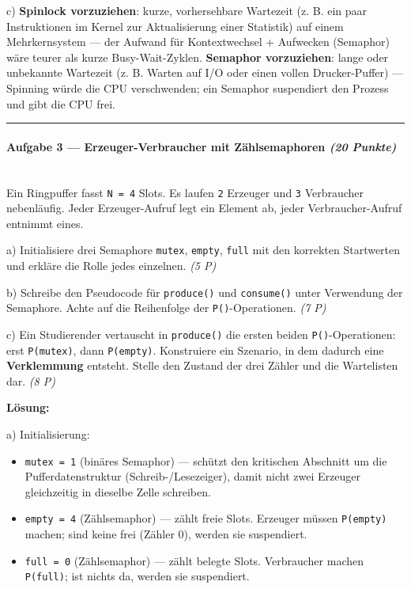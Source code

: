 \documentclass[11pt, a4paper]{article}
\begin{document}
c) \textbf{Spinlock vorzuziehen}: kurze, vorhersehbare Wartezeit (z. B. ein paar Instruktionen im Kernel zur Aktualisierung einer Statistik) auf einem Mehrkernsystem — der Aufwand für Kontextwechsel + Aufwecken (Semaphor) wäre teurer als kurze Busy-Wait-Zyklen. \textbf{Semaphor vorzuziehen}: lange oder unbekannte Wartezeit (z. B. Warten auf I/O oder einen vollen Drucker-Puffer) — Spinning würde die CPU verschwenden; ein Semaphor suspendiert den Prozess und gibt die CPU frei.



\noindent\textcolor{rulegray}{\rule{\linewidth}{0.4pt}}


\paragraph{Aufgabe 3 — Erzeuger-Verbraucher mit Zählsemaphoren \textit{(20 Punkte)}}\mbox{}\\[2pt]

Ein Ringpuffer fasst \texttt{N = 4} Slots. Es laufen \texttt{2} Erzeuger und \texttt{3} Verbraucher nebenläufig. Jeder Erzeuger-Aufruf legt ein Element ab, jeder Verbraucher-Aufruf entnimmt eines.


a) Initialisiere drei Semaphore \texttt{mutex}, \texttt{empty}, \texttt{full} mit den korrekten Startwerten und erkläre die Rolle jedes einzelnen. \textit{(5 P)}


b) Schreibe den Pseudocode für \texttt{produce()} und \texttt{consume()} unter Verwendung der Semaphore. Achte auf die Reihenfolge der \texttt{P()}-Operationen. \textit{(7 P)}


c) Ein Studierender vertauscht in \texttt{produce()} die ersten beiden \texttt{P()}-Operationen: erst \texttt{P(mutex)}, dann \texttt{P(empty)}. Konstruiere ein Szenario, in dem dadurch eine \textbf{Verklemmung} entsteht. Stelle den Zustand der drei Zähler und die Wartelisten dar. \textit{(8 P)}


\textbf{Lösung:}


a) Initialisierung:


\begin{itemize}
  \item \texttt{mutex = 1} (binäres Semaphor) — schützt den kritischen Abschnitt um die Pufferdatenstruktur (Schreib-/Lesezeiger), damit nicht zwei Erzeuger gleichzeitig in dieselbe Zelle schreiben.
  \item \texttt{empty = 4} (Zählsemaphor) — zählt freie Slots. Erzeuger müssen \texttt{P(empty)} machen; sind keine frei (Zähler 0), werden sie suspendiert.
  \item \texttt{full = 0} (Zählsemaphor) — zählt belegte Slots. Verbraucher machen \texttt{P(full)}; ist nichts da, werden sie suspendiert.
\end{itemize}
\end{document}
